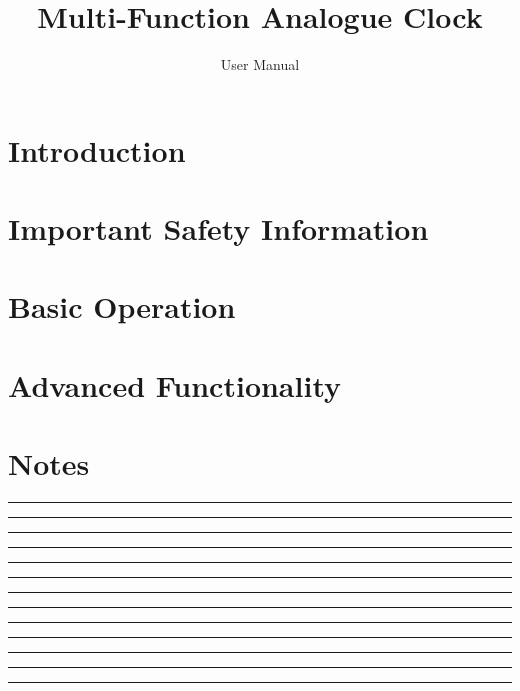 \documentclass[11pt,a4paper,twoside,titlepage]{scrartcl}
\title{\vspace{-24pt}\Huge Multi-Function Analogue Clock}
\subtitle{\vspace{8pt}\LARGE User Manual}
\author{}
\date{\vspace{12pt}\missingfigure{Beautiful illustration of the finished clock}}
\begin{document}
\maketitle


\section{Introduction}


\clearpage
\section{Important Safety Information}


\clearpage
\section{Basic Operation}


\clearpage
\section{Advanced Functionality}



\clearpage
\appendix
\appendixpage



\clearpage
\section{Notes}
\vspace{1cm}
\noindent\rule{\textwidth}{0.2pt}
\vspace{1cm}
\noindent\rule{\textwidth}{0.2pt}
\vspace{1cm}
\noindent\rule{\textwidth}{0.2pt}
\vspace{1cm}
\noindent\rule{\textwidth}{0.2pt}
\vspace{1cm}
\noindent\rule{\textwidth}{0.2pt}
\vspace{1cm}
\noindent\rule{\textwidth}{0.2pt}
\vspace{1cm}
\noindent\rule{\textwidth}{0.2pt}
\vspace{1cm}
\noindent\rule{\textwidth}{0.2pt}
\vspace{1cm}
\noindent\rule{\textwidth}{0.2pt}
\vspace{1cm}
\noindent\rule{\textwidth}{0.2pt}
\vspace{1cm}
\noindent\rule{\textwidth}{0.2pt}
\vspace{1cm}
\noindent\rule{\textwidth}{0.2pt}
\vspace{1cm}
\noindent\rule{\textwidth}{0.2pt}
\vspace{1cm}
\end{document}
